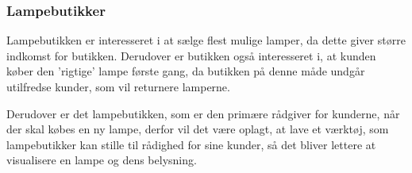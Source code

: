 \subsubsection{Lampebutikker}
Lampebutikken er interesseret i at sælge flest mulige lamper, da dette giver større indkomst for butikken. Derudover er butikken også interesseret i, at kunden køber den 'rigtige' lampe første gang, da butikken på denne måde undgår utilfredse kunder, som vil returnere lamperne. 

Derudover er det lampebutikken, som er den primære rådgiver for kunderne, når der skal købes en ny lampe, derfor vil det være oplagt, at lave et værktøj, som lampebutikker kan stille til rådighed for sine kunder, så det bliver lettere at visualisere en lampe og dens belysning.


 